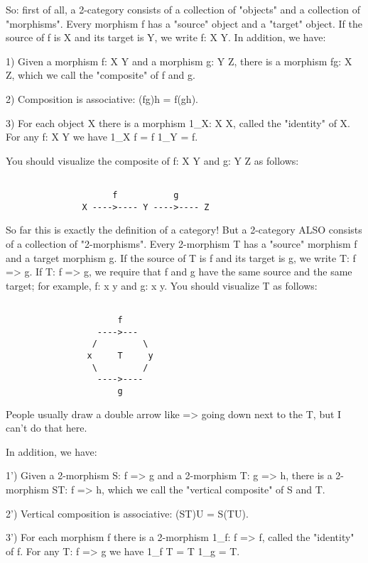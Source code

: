So: first of all, a 2-category consists of a collection of "objects" and a
collection of "morphisms".  Every morphism f has a "source" object and a
"target" object.  If the source of f is X and its target is Y, we write
f: X \to  Y.  In addition, we have:

1)  Given a morphism f: X \to  Y and a morphism g: Y \to  Z, there
is a morphism fg: X \to  Z, which we call the "composite" of f and g.

2)  Composition is associative:  (fg)h = f(gh).

3)  For each object X there is a morphism 1_{X}: X \to  X, called the
"identity" of X.  For any f: X \to  Y we have 1_{X} f = f 1_{Y} = f.

You should visualize the composite of f: X \to  Y and g: Y \to  Z as
follows:


\begin{verbatim}

                     f           g
               X ---->---- Y ---->---- Z

\end{verbatim}
    
So far this is exactly the definition of a category!  But a 2-category
ALSO consists of a collection of "2-morphisms".  Every 2-morphism T has
a "source" morphism f and a target morphism g.  If the source of T is f
and its target is g, we write T: f => g.  If T: f => g, we require that
f and g have the same source and the same target; for example, f: x \to  y
and g: x \to  y.  You should visualize T as follows:


\begin{verbatim}

                      f
                  ---->---
                 /         \
                x     T     y
                 \         /
                  ---->----
                      g

\end{verbatim}
    
People usually draw a double arrow like => going down next to the T, but
I can't do that here.  

In addition, we have:

1') Given a 2-morphism S: f => g and a 2-morphism T: g => h, there is a
2-morphism ST: f => h, which we call the "vertical composite" of S and
T.

2')  Vertical composition is associative:  (ST)U = S(TU).


3') For each morphism f there is a 2-morphism 1_{f}: f => f,
called the "identity" of f.  For any T: f => g we have
1_{f} T = T 1_{g} = T.

